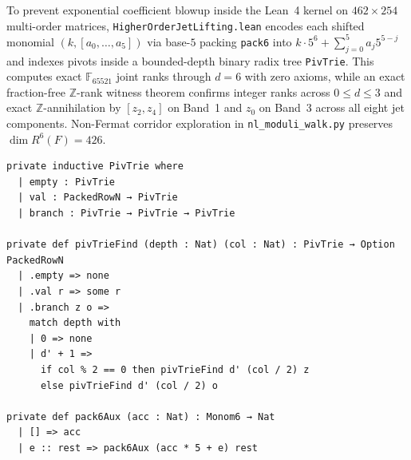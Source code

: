 \documentclass[11pt,a4paper]{article}
\begin{document}
To prevent exponential coefficient blowup inside the Lean~4 kernel on $462 \times 254$ multi-order matrices, \texttt{HigherOrderJetLifting.lean} encodes each shifted monomial $(k, [a_0,\dots,a_5])$ via base-$5$ packing \texttt{pack6} into $k \cdot 5^6 + \sum_{j=0}^5 a_j 5^{5-j}$ and indexes pivots inside a bounded-depth binary radix tree \texttt{PivTrie}. This computes exact $\mathbb{F}_{65521}$ joint ranks through $d = 6$ with zero axioms, while an exact fraction-free $\mathbb{Z}$-rank witness theorem confirms integer ranks across $0 \le d \le 3$ and exact $\mathbb{Z}$-annihilation by $[z_2, z_4]$ on Band~1 and $z_0$ on Band~3 across all eight jet components. Non-Fermat corridor exploration in \texttt{nl\_moduli\_walk.py} preserves $\dim R^6(F) = 426$.

\begin{lstlisting}[caption={Binary radix pivot trie and base-$5$ packing in \texttt{HigherOrderJetLifting.lean}.}]
private inductive PivTrie where
  | empty : PivTrie
  | val : PackedRowN → PivTrie
  | branch : PivTrie → PivTrie → PivTrie

private def pivTrieFind (depth : Nat) (col : Nat) : PivTrie → Option PackedRowN
  | .empty => none
  | .val r => some r
  | .branch z o =>
    match depth with
    | 0 => none
    | d' + 1 =>
      if col % 2 == 0 then pivTrieFind d' (col / 2) z
      else pivTrieFind d' (col / 2) o

private def pack6Aux (acc : Nat) : Monom6 → Nat
  | [] => acc
  | e :: rest => pack6Aux (acc * 5 + e) rest
\end{lstlisting}
\end{document}
